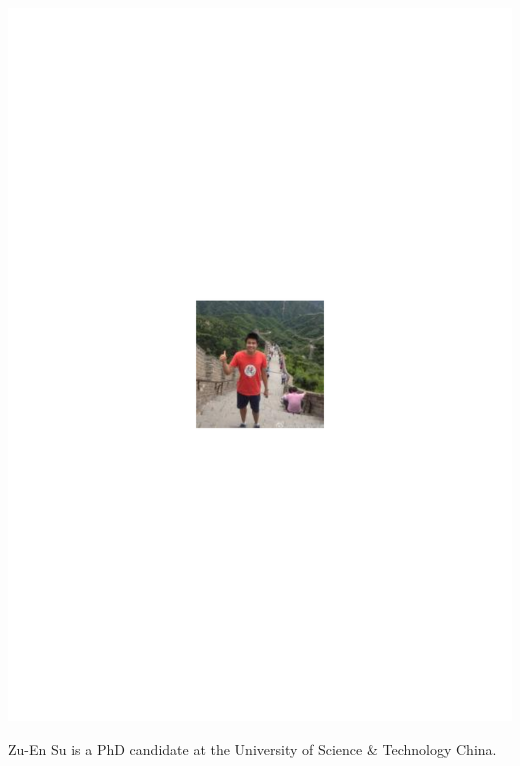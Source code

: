 \documentclass[aps,prl,twocolumn,amsmath,amssymb,nofootinbib,superscriptaddress]{revtex4}
\begin{document}
\includegraphics[width=\columnwidth]{photo_zuen_su}

Zu-En Su is a PhD candidate at the University of Science \& Technology China.
\end{document}
